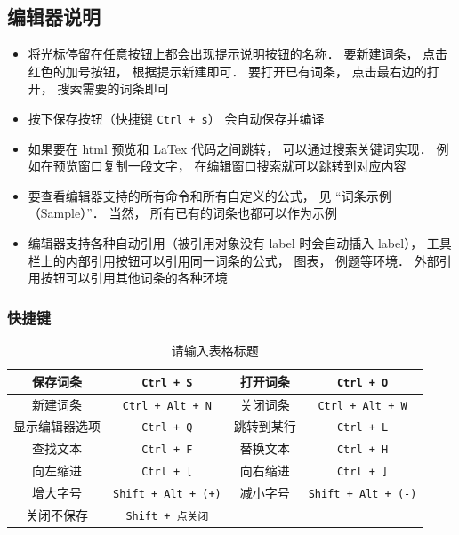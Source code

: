 \subsection{编辑器说明}
\begin{itemize}
\item 将光标停留在任意按钮上都会出现提示说明按钮的名称． 要新建词条， 点击红色的加号按钮， 根据提示新建即可． 要打开已有词条， 点击最右边的打开， 搜索需要的词条即可

\item 按下保存按钮（快捷键 \lstinline|Ctrl + s|） 会自动保存并编译

\item 如果要在 html 预览和 LaTex 代码之间跳转， 可以通过搜索关键词实现． 例如在预览窗口复制一段文字， 在编辑窗口搜索就可以跳转到对应内容

\item 要查看编辑器支持的所有命令和所有自定义的公式， 见 “词条示例（Sample）”． 当然， 所有已有的词条也都可以作为示例

\item 编辑器支持各种自动引用（被引用对象没有 label 时会自动插入 label）， 工具栏上的内部引用按钮可以引用同一词条的公式， 图表， 例题等环境． 外部引用按钮可以引用其他词条的各种环境
\end{itemize}

\subsubsection{快捷键}

\begin{table}[ht]
\centering
\caption{请输入表格标题}\label{readme_tab1}
\begin{tabular}{|c|c|c|c|}
\hline
保存词条 & \lstinline|Ctrl + S| & 打开词条 & \lstinline|Ctrl + O| \\
\hline
新建词条 & \lstinline|Ctrl + Alt + N| & 关闭词条 & \lstinline|Ctrl + Alt + W| \\
\hline
显示编辑器选项 & \lstinline|Ctrl + Q| & 跳转到某行 & \lstinline|Ctrl + L| \\
\hline
查找文本 & \lstinline|Ctrl + F| & 替换文本 & \lstinline|Ctrl + H| \\
\hline
向左缩进 & \lstinline|Ctrl + [| & 向右缩进 & \lstinline|Ctrl + ]| \\
\hline
增大字号 & \lstinline|Shift + Alt + (+)| & 减小字号 & \lstinline|Shift + Alt + (-)| \\
\hline
关闭不保存 & \lstinline|Shift + 点关闭| &  &  \\
\hline
\end{tabular}
\end{table}

